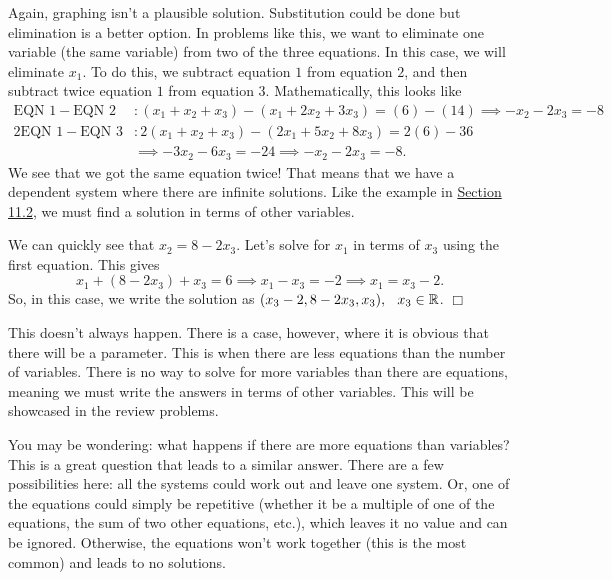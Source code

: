 \documentclass[lang=en,11pt]{elegantbook}
\begin{document}
\begin{solution}
Again, graphing isn't a plausible solution.  Substitution could be done but elimination is a better option.  In problems like this, we want to eliminate one variable (the same variable) from two of the three equations.  In this case, we will eliminate $x_1$.  To do this, we subtract equation $1$ from equation $2$, and then subtract twice equation $1$ from equation $3$.  Mathematically, this looks like \begin{align*}
    \text{EQN } 1 - \text{EQN } 2&: (x_1+x_2+x_3)-(x_1+2x_2+3x_3)=(6)-(14) \implies -x_2-2x_3=-8\\
    2\text{EQN } 1 - \text{EQN } 3&: 2(x_1+x_2+x_3)-(2x_1+5x_2+8x_3)=2(6)-36 \\
    &\implies -3x_2-6x_3=-24 \implies -x_2-2x_3=-8.
\end{align*}
We see that we got the same equation twice!  That means that we have a dependent system where there are infinite solutions.  Like the example in \hyperlink{section.11.2}{Section 11.2}, we must find a solution in terms of other variables.

We can quickly see that $x_2=8-2x_3$.  Let's solve for $x_1$ in terms of $x_3$ using the first equation.  This gives $$x_1+(8-2x_3)+x_3=6 \implies x_1-x_3=-2 \implies x_1=x_3-2.$$  So, in this case, we write the solution as $(x_3-2,8-2x_3,x_3), \hspace{0.10in} x_3\in\mathbb{R}$.  $\Box$
\end{solution}
This doesn't always happen.  There is a case, however, where it is obvious that there will be a parameter.  This is when there are less equations than the number of variables.  There is no way to solve for more variables than there are equations, meaning we must write the answers in terms of other variables.  This will be showcased in the review problems.

\begin{remark}
You may be wondering: what happens if there are more equations than variables?  This is a great question that leads to a similar answer.  There are a few possibilities here: all the systems could work out and leave one system.  Or, one of the equations could simply be repetitive (whether it be a multiple of one of the equations, the sum of two other equations, etc.), which leaves it no value and can be ignored.  Otherwise, the equations won't work together (this is the most common) and leads to no solutions.
\end{remark}
\end{document}

